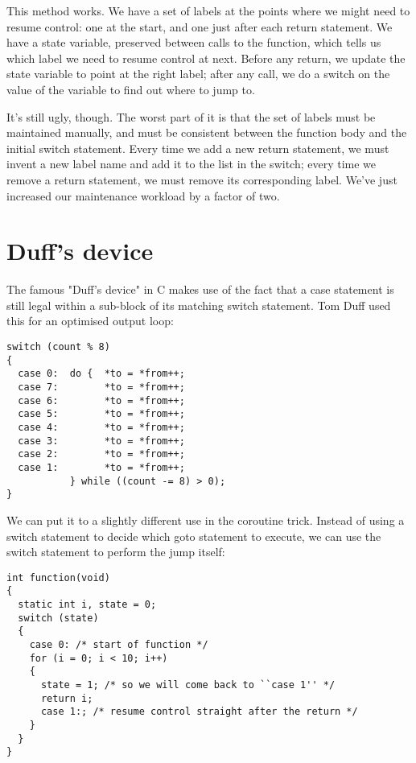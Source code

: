 \documentclass[12pt]{article}
\begin{document}
\begin{CJK}{UTF8}{bsmi}
This method works. We have a set of labels at the points where we might need to resume control: one at the start, and one just after each return statement. We have a state variable, preserved between calls to the function, which tells us which label we need to resume control at next. Before any return, we update the state variable to point at the right label; after any call, we do a switch on the value of the variable to find out where to jump to.

It's still ugly, though. The worst part of it is that the set of labels must be maintained manually, and must be consistent between the function body and the initial switch statement. Every time we add a new return statement, we must invent a new label name and add it to the list in the switch; every time we remove a return statement, we must remove its corresponding label. We've just increased our maintenance workload by a factor of two.

\section{Duff's device}

The famous "Duff's device" in C makes use of the fact that a case statement is still legal within a sub-block of its matching switch statement. Tom Duff used this for an optimised output loop: 

\begin{lstlisting}[basicstyle=\footnotesize, breaklines=true]
switch (count % 8) 
{
  case 0:  do {  *to = *from++;
  case 7:        *to = *from++;
  case 6:        *to = *from++;
  case 5:        *to = *from++;
  case 4:        *to = *from++;
  case 3:        *to = *from++;
  case 2:        *to = *from++;
  case 1:        *to = *from++;
           } while ((count -= 8) > 0);
}
\end{lstlisting}

We can put it to a slightly different use in the coroutine trick. Instead of using a switch statement to decide which goto statement to execute, we can use the switch statement to perform the jump itself:

\begin{lstlisting}[basicstyle=\footnotesize, breaklines=true]
int function(void) 
{
  static int i, state = 0;
  switch (state) 
  {
    case 0: /* start of function */
    for (i = 0; i < 10; i++) 
    {
      state = 1; /* so we will come back to ``case 1'' */
      return i;
      case 1:; /* resume control straight after the return */
    }
  }
}
\end{lstlisting}


\end{CJK}
\end{document}
